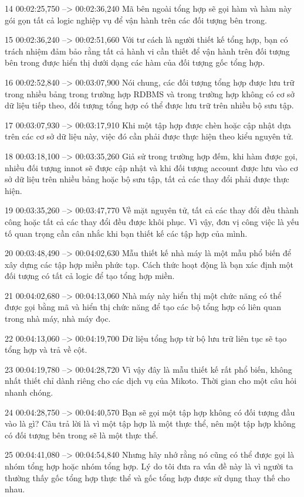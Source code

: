 14
00:02:25,750 --> 00:02:36,240
Mã bên ngoài tổng hợp sẽ gọi hàm và hàm này gói gọn tất cả logic nghiệp vụ để vận hành trên các đối tượng bên trong.

15
00:02:36,240 --> 00:02:51,660
Với tư cách là người thiết kế tổng hợp, bạn có trách nhiệm đảm bảo rằng tất cả hành vi cần thiết để vận hành trên đối tượng bên trong được hiển thị dưới dạng các hàm của đối tượng gốc tổng hợp.

16
00:02:52,840 --> 00:03:07,900
Nói chung, các đối tượng tổng hợp được lưu trữ trong nhiều bảng trong trường hợp RDBMS và trong trường hợp không có cơ sở dữ liệu tiếp theo, đối tượng tổng hợp có thể được lưu trữ trên nhiều bộ sưu tập.

17
00:03:07,930 --> 00:03:17,910
Khi một tập hợp được chèn hoặc cập nhật dựa trên các cơ sở dữ liệu này, việc đó cần phải được thực hiện theo kiểu nguyên tử.

18
00:03:18,100 --> 00:03:35,260
Giả sử trong trường hợp đếm, khi hàm được gọi, nhiều đối tượng innot sẽ được cập nhật và khi đối tượng account được lưu vào cơ sở dữ liệu trên nhiều bảng hoặc bộ sưu tập, tất cả các thay đổi phải được thực hiện.

19
00:03:35,260 --> 00:03:47,770
Về mặt nguyên tử, tất cả các thay đổi đều thành công hoặc tất cả các thay đổi đều được khôi phục.  Vì vậy, đơn vị công việc là yếu tố quan trọng cần cân nhắc khi bạn thiết kế các tập hợp của mình.

20
00:03:48,490 --> 00:04:02,630
Mẫu thiết kế nhà máy là một mẫu phổ biến để xây dựng các tập hợp miền phức tạp.  Cách thức hoạt động là bạn xác định một đối tượng có tất cả logic để tạo tổng hợp miền.

21
00:04:02,680 --> 00:04:13,060
Nhà máy này hiển thị một chức năng có thể được gọi bằng mã và hiển thị chức năng để tạo các bộ tổng hợp có liên quan trong nhà máy, nhà máy đọc.

22
00:04:13,060 --> 00:04:19,700
Dữ liệu tổng hợp từ bộ lưu trữ liên tục sẽ tạo tổng hợp và trả về cột.

23
00:04:19,780 --> 00:04:28,720
Vì vậy đây là mẫu thiết kế rất phổ biến, không nhất thiết chỉ dành riêng cho các dịch vụ của Mikoto.  Thời gian cho một câu hỏi nhanh chóng.

24
00:04:28,750 --> 00:04:40,570
Bạn sẽ gọi một tập hợp không có đối tượng đầu vào là gì?  Câu trả lời là vì một tập hợp là một thực thể, nên một tập hợp không có đối tượng bên trong sẽ là một thực thể.

25
00:04:41,080 --> 00:04:54,840
Nhưng hãy nhớ rằng nó cũng có thể được gọi là nhóm tổng hợp hoặc nhóm tổng hợp.  Lý do tôi đưa ra vấn đề này là vì người ta thường thấy gốc tổng hợp thực thể và gốc tổng hợp được sử dụng thay thế cho nhau.

